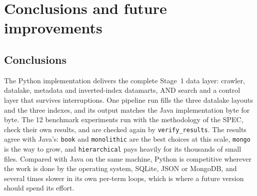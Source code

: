 \documentclass[11pt,a4paper]{article}
\newcommand{\code}[1]{\texttt{#1}}
\begin{document}
\section{Conclusions and future improvements}

\subsection{Conclusions}
The Python implementation delivers the complete Stage~1 data layer: crawler, datalake, metadata and
inverted-index datamarts, AND search and a control layer that survives interruptions. One pipeline
run fills the three datalake layouts and the three indexes, and its output matches the Java
implementation byte for byte. The 12 benchmark experiments run with the methodology of the SPEC,
check their own results, and are checked again by \code{verify\_results}. The results agree with Java's: \code{book} and \code{monolithic} are the best choices at this scale,
\code{mongo} is the way to grow, and \code{hierarchical} pays heavily for its thousands of small
files. Compared with Java on the same machine, Python is competitive wherever the work is done by
the operating system, SQLite, JSON or MongoDB, and several times slower in its own per-term loops,
which is where a future version should spend its effort.
\end{document}
